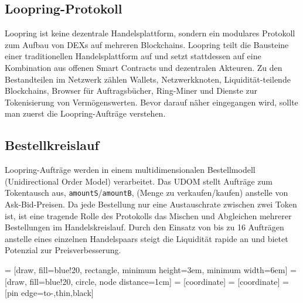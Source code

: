 \documentclass[UTF8,nofonts]{article}
\makeatletter
\newenvironment{figurehere}
 {\def\@captype{figure}}
 {}
\makeatother
\begin{document}
\begin{multicols}{2}
\section{Loopring-Protokoll\label{sec:loopring_protocol}}
Loopring ist keine dezentrale Handelsplattform, sondern ein modulares Protokoll zum Aufbau von DEXs auf mehreren Blockchains. Loopring teilt die Bausteine einer traditionellen Handelsplattform auf und setzt stattdessen auf eine Kombination aus offenen Smart Contracts und dezentralen Akteuren. Zu den Bestandteilen im Netzwerk zählen Wallets, Netzwerkknoten, Liquidität-teilende Blockchains, Browser für Auftragsbücher, Ring-Miner und Dienste zur Tokenisierung von Vermögenswerten. Bevor darauf näher eingegangen wird, sollte man zuerst die Loopring-Aufträge verstehen.

\subsection{Bestellkreislauf\label{sec:order_ring}}
Loopring-Aufträge werden in einem multidimensionalen Bestellmodell (Unidirectional Order Model) \cite{coinport2014udom} verarbeitet. Das UDOM stellt Aufträge zum Tokentausch aus, \verb|amountS|/\verb|amountB|, (Menge zu verkaufen/kaufen) anstelle von Ask-Bid-Preisen. Da jede Bestellung nur eine Austauschrate zwischen zwei Token ist, ist eine tragende Rolle des Protokolls das Mischen und Abgleichen mehrerer Bestellungen im Handelskreislauf. Durch den Einsatz von bis zu 16 Aufträgen anstelle eines einzelnen Handelspaars steigt die Liquidität rapide an und bietet Potenzial zur Preisverbesserung.

\begin{center}
\begin{figurehere}
\centering
{} = [draw, fill=blue!20, rectangle, 
    minimum height=3em, minimum width=6em]
 = [draw, fill=blue!20, circle, node distance=1cm]
 = [coordinate]
 = [coordinate]
 = [pin edge={to-,thin,black}]

\end{figurehere}
\end{center}
\end{multicols}
\end{document}
